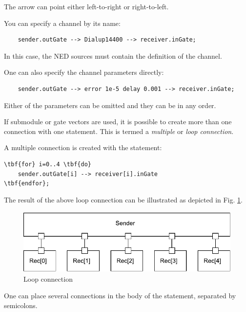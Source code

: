 The arrow can point either left-to-right or right-to-left.

You can specify a channel by its name:
\begin{verbatim}
    sender.outGate --> Dialup14400 --> receiver.inGate;
\end{verbatim}

In this case, the NED sources must contain the definition of
the channel.

One can also specify the channel parameters directly:
\begin{verbatim}
    sender.outGate --> error 1e-5 delay 0.001 --> receiver.inGate;
\end{verbatim}

Either of the parameters can be omitted and they can be in any
order.




If submodule or gate vectors are used, it is possible to create
more than one connection with one statement. This is termed a \textit{multiple}
or \textit{loop connection}.

A multiple connection is created with the 
statement:

\begin{Verbatim}[commandchars=\\\{\}]
\tbf{for} i=0..4 \tbf{do}
    sender.outGate[i] --> receiver[i].inGate
\tbf{endfor};
\end{Verbatim}


The result of the above loop connection can be illustrated as
depicted in Fig. \ref{fig:ch-ned-lang:loop-connection}.

\begin{figure}[htbp]
\begin{center}
\includegraphics[width=4.625in, height=1.297in]{figures/usmanFig7}
\caption{Loop connection}
\label{fig:ch-ned-lang:loop-connection}
\end{center}
\end{figure}


One can place several connections in the body of the
 statement, separated by semicolons.

